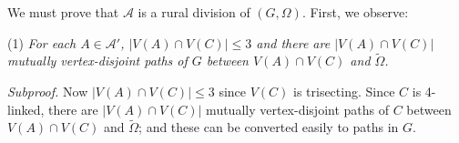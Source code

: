 We must prove that $\mathcal{A}$ is a rural division of $(G, \Omega)$. First, we observe:

\hspace*{12pt}(1) \textit{For each $A \in \mathcal{A}'$, $|V(A) \cap V(C)| \le 3$ and there are $|V(A) \cap V(C)|$ mutually vertex-disjoint paths of $G$ between $V(A) \cap V(C)$ and $\tilde{\Omega}$.}

\textit{Subproof.} Now $|V(A) \cap V(C)| \le 3$ since $V(C)$ is trisecting. Since $C$ is 4-linked, there are $|V(A) \cap V(C)|$ mutually vertex-disjoint paths of $C$ between $V(A) \cap V(C)$ and $\tilde{\Omega}$; and these can be converted easily to paths in $G$.
